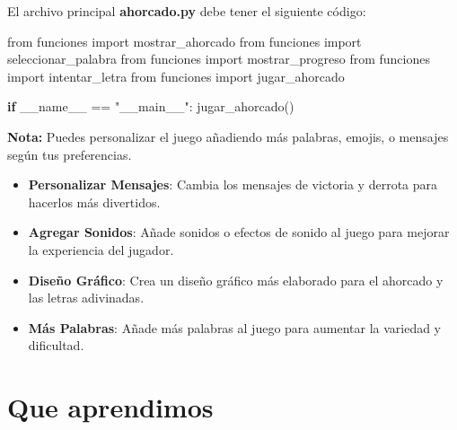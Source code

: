 \documentclass[
  a4paper,
  DIV=11,
  numbers=noendperiod,
  onepage,
  openany]{scrreprt}
\newenvironment{Shaded}{\begin{snugshade}}{\end{snugshade}}
\newcommand{\ControlFlowTok}[1]{\textcolor[rgb]{0.00,0.23,0.31}{\textbf{#1}}}
\newcommand{\ImportTok}[1]{\textcolor[rgb]{0.00,0.46,0.62}{#1}}
\newcommand{\NormalTok}[1]{\textcolor[rgb]{0.00,0.23,0.31}{#1}}
\newcommand{\OperatorTok}[1]{\textcolor[rgb]{0.37,0.37,0.37}{#1}}
\newcommand{\StringTok}[1]{\textcolor[rgb]{0.13,0.47,0.30}{#1}}
\newcommand{\VariableTok}[1]{\textcolor[rgb]{0.07,0.07,0.07}{#1}}
\begin{document}
El archivo principal \textbf{ahorcado.py} debe tener el siguiente
código:

\begin{Shaded}
\begin{Highlighting}[]
\ImportTok{from}\NormalTok{ funciones }\ImportTok{import}\NormalTok{ mostrar\_ahorcado}
\ImportTok{from}\NormalTok{ funciones }\ImportTok{import}\NormalTok{ seleccionar\_palabra}
\ImportTok{from}\NormalTok{ funciones }\ImportTok{import}\NormalTok{ mostrar\_progreso}
\ImportTok{from}\NormalTok{ funciones }\ImportTok{import}\NormalTok{ intentar\_letra}
\ImportTok{from}\NormalTok{ funciones }\ImportTok{import}\NormalTok{ jugar\_ahorcado}

\ControlFlowTok{if} \VariableTok{\_\_name\_\_} \OperatorTok{==} \StringTok{"\_\_main\_\_"}\NormalTok{:}
\NormalTok{    jugar\_ahorcado()}
\end{Highlighting}
\end{Shaded}

\begin{tcolorbox}[enhanced jigsaw, bottomrule=.15mm, title=\textcolor{quarto-callout-tip-color}{\faLightbulb}\hspace{0.5em}{Tip}, colbacktitle=quarto-callout-tip-color!10!white, opacityback=0, breakable, coltitle=black, bottomtitle=1mm, leftrule=.75mm, titlerule=0mm, arc=.35mm, rightrule=.15mm, toptitle=1mm, left=2mm, opacitybacktitle=0.6, toprule=.15mm, colframe=quarto-callout-tip-color-frame, colback=white]

\textbf{Nota:} Puedes personalizar el juego añadiendo más palabras,
emojis, o mensajes según tus preferencias.

\end{tcolorbox}

\begin{itemize}
\item
  \textbf{Personalizar Mensajes}: Cambia los mensajes de victoria y
  derrota para hacerlos más divertidos.
\item
  \textbf{Agregar Sonidos}: Añade sonidos o efectos de sonido al juego
  para mejorar la experiencia del jugador.
\item
  \textbf{Diseño Gráfico}: Crea un diseño gráfico más elaborado para el
  ahorcado y las letras adivinadas.
\item
  \textbf{Más Palabras}: Añade más palabras al juego para aumentar la
  variedad y dificultad.
\end{itemize}

\chapter{Que aprendimos}\label{que-aprendimos}
\end{document}
